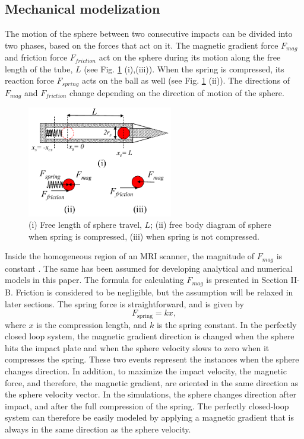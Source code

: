 \documentclass[letterpaper, 10 pt, conference]{ieeeconf}  %
\begin{document}
\subsection{Mechanical modelization}
The motion of the sphere between two consecutive impacts can be divided into two  phases, based on the forces that act on it. The magnetic gradient force $F_{mag}$ and friction force $F_{friction}$ act on the sphere during its motion along the free length of the tube, $L$ (see Fig. \ref{FBD} (i),(iii)). When the spring is compressed, its reaction force $F_{spring}$ acts on the ball as well (see Fig. \ref{FBD} (ii)). The directions of $F_{mag}$ and $F_{friction}$  change depending on the direction of motion of the sphere. 
\begin{figure}
	\begin{centering}
	\includegraphics[width=180pt]{FBD_R1.pdf}
	\caption{(i) Free length of sphere travel, $L$; (ii) free body diagram of sphere when spring is compressed, (iii) when spring is not compressed.}
	\label{FBD}
	\end{centering}
	\vspace{-2em}
	\end{figure}
Inside the homogeneous region of an MRI scanner, the magnitude of $F_{mag}$ is constant \cite{CMR:CMR20163}. The same has been assumed for developing analytical and numerical models in this paper. The formula for calculating $F_{mag}$ is presented in Section II-B. Friction is considered to be negligible, but the assumption will be relaxed in later sections. The spring force is straightforward, and is given by
\begin{equation}
F_{\text{spring}}=k x,
\label{spring_force}
\end{equation}
where $x$ is the compression length, and $k$ is the spring constant. In the perfectly closed loop system, the magnetic gradient direction is changed when the sphere hits the impact plate and when the sphere velocity slows to zero when it compresses the spring. These two events represent the instances when the sphere changes direction. In addition, to maximize the impact velocity, the magnetic force, and therefore, the magnetic gradient, are oriented in the same direction as the sphere velocity vector. In the simulations, the sphere changes direction after impact, and after the full compression of the spring. The perfectly closed-loop system can therefore be easily modeled by applying a magnetic gradient that is always in the same direction as the sphere velocity.
\end{document}
